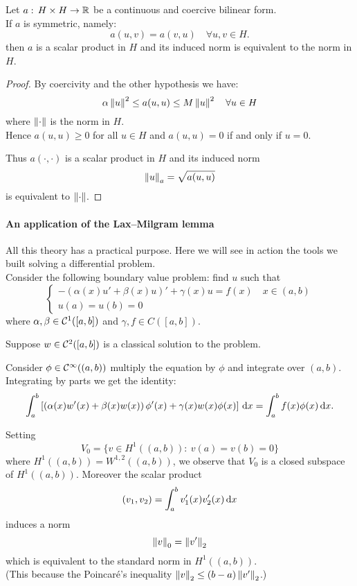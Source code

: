 \begin{prop}
	Let $a: \, H \times H \to \mathbb R$ be a continuous and coercive bilinear form.\\
	If $a$ is symmetric, namely:
	$$
		a(u,v) 
		= a(v,u) 
		\quad \forall u,v \in H
		.
	$$
	then $a$ is a scalar product in $H$ and its induced norm is equivalent to the norm in $H$.
\end{prop}

\begin{proof}
	By coercivity and the other hypothesis we have:
	$$
		\alpha \left\lVert u\right\rVert^2 
		\leq a(u,u) \leq M\left\lVert u\right\rVert^2 
		\quad \forall u \in H
	$$
	where $\left\lVert\cdot\right\rVert$ is the norm in $H$.\\
	
	Hence $a(u,u) \geq 0$ for all $u \in H$ and $a(u,u) = 0$ if and only if $u = 0$.
	
	Thus $a(\cdot, \cdot)$ is a scalar product in $H$ and its induced norm
	$$
		\left\lVert u\right\rVert_a 
		= \sqrt{a(u,u)}
	$$
	is equivalent to $\left\lVert\cdot\right\rVert$.
\end{proof}


\paragraph{An application of the Lax--Milgram lemma}\label{app-lax-milgram} All this theory has a practical purpose. Here we will see in action the tools we built solving a differential problem.\\
Consider the following boundary value problem: find $u$ such that
$$
	\begin{cases}
	-(  \alpha(x) u' + \beta(x) u)' + \gamma(x)u 
	= f(x)
	\quad x \in (a,b)\\
	u(a) 
	= u(b) 
	= 0
	\end{cases}
$$
where $\alpha, \beta \in \mathcal C^1([a,b])$ and $\gamma, f \in C([a,b])$.

Suppose $w \in \mathcal C^2([a,b])$ is a classical solution to the problem.

Consider $\phi \in \mathcal C^\infty((a,b))$ multiply the equation by $\phi$ and integrate over $(a,b)$.
Integrating by parts we get the identity:
$$
	\int_a^b \left[
	\left(\alpha(x)w'(x)
	+ \beta(x)w(x) \right)\phi'(x)
	+ \gamma(x)w(x)\phi(x)\right]\,\mathrm d x 
	= \int_a^bf(x) \phi(x) \, \mathrm d x
	.
$$

Setting
$$
	V_0
	= \{v \in H^1((a,b))
	: \ v(a)
	=v(b)
	=0\}
$$
where $H^1((a,b)) = W^{1,2}((a,b))$, we observe that $V_0$ is a closed subspace of $H^1((a,b))$. Moreover the scalar product
$$
	(v_1, v_2) 
	= \int_a^b v_1'(x) v_2'(x) \, \mathrm d x
$$
induces a norm
$$
	\left\lVert v\right\rVert_0 
	= \left\lVert v'\right\rVert_2
$$
which is equivalent to the standard norm in $H^1((a,b))$.\\
(This because the Poincaré's inequality $\left\lVert v\right\rVert_2 \leq (b-a)\left\lVert v'\right\rVert_2$.)\\

